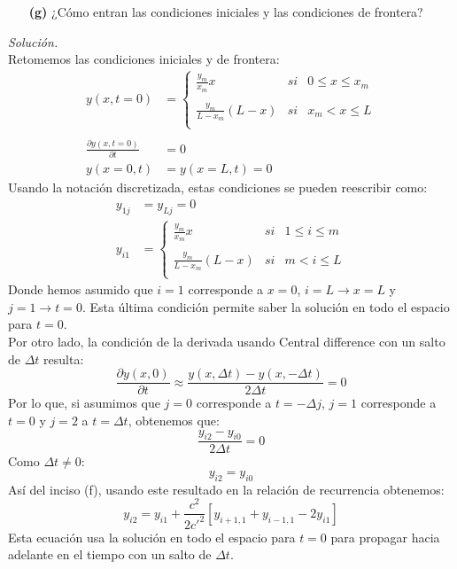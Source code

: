 \documentclass[11pt]{article}
\begin{document}
\begin{enumerate}
	\item [\textbf{(g)}] ¿Cómo entran las condiciones iniciales y las condiciones de frontera? 
\end{enumerate}
\textit{Solución.}\\	
	Retomemos las condiciones iniciales y de frontera:
	\begin{align*}
		y(x, t=0)&= \left\{\begin{array}{lcc}
			\frac{y_m}{x_m} x &   si  & 0\leq x \leq x_m \\\\
			\frac{y_m}{L-x_m} (L-x) &  si &  x_m<x \leq  L \\
		\end{array}\right. \\\\
		\frac{\partial y(x, t=0)}{\partial t} &=0 \\
		y(x=0, t) &= y(x=L,t) = 0
	\end{align*}
	Usando la notación discretizada, estas condiciones se pueden reescribir como:
	\begin{align}
		y_{1j}&= y_{Lj}=0\\
		y_{i 1}&= \left\{\begin{array}{lcc}
			\frac{y_m}{x_m} x &   si  & 1\leq i \leq m \\\\
			\frac{y_m}{L-x_m} (L-x) &  si &  m<i  \leq  L \\
		\end{array}\right. \label{m1}
	\end{align}
	Donde hemos asumido que $i=1$ corresponde a $x=0$, $i=L\to x=L$ y $j=1\to t=0$. Esta última condición permite saber la solución en todo el espacio para $t=0$.\\
	Por otro lado, la condición de la derivada usando Central difference con un salto de $\Delta t $  resulta:
	$$\frac{\partial y(x,0)}{\partial t}\approx \frac{y(x,\Delta t)- y(x,-\Delta t)}{2\Delta t}	= 0 $$
	Por lo que, si asumimos que $j=0$ corresponde a $t= -\Delta j$, $j=1$ corresponde a $t=0$ y $j=2$ a $t=\Delta t$, obtenemos que:
	$$\frac{y_{i2}- y_{i0}}{2\Delta t}	= 0 $$
	Como $\Delta t\neq 0$:
	\begin{equation}\label{m0}
		y_{i2} = y_{i0}
	\end{equation}
	Así del inciso (f), usando este resultado en la relación de recurrencia obtenemos:
	\begin{equation}\label{m2}
		y_{i2} = y_{i1} + \frac{c^2}{2c'^2} [ y_{i+1,1} + y_{i-1,1}-2y_{i1}]
	\end{equation}
	Esta ecuación usa la solución en todo el espacio para $t=0$ para propagar hacia adelante en el tiempo con un salto de $\Delta t$. \\
	
\end{document}
